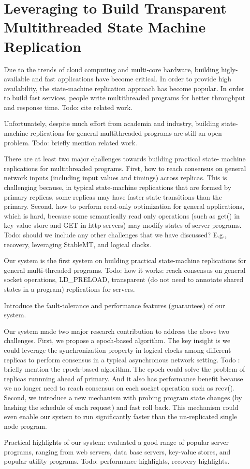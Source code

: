 \section{Leveraging \smt to Build Transparent Multithreaded State Machine Replication} \label{sec:replication}

Due to the trends of cloud computing and multi-core hardware, building higly-
available and fast applications have become critical. In order to 
provide high availability, the state-machine replication approach has become 
popular. In order to build fast services, people write multithreaded programs 
for better throughput and response time. Todo: cite related work.

Unfortunately, despite much effort from academia and industry, building state-
machine replications for general multithreaded programs are still an open 
problem. Todo: briefly mention related work.

There are at least two major challenges towards building practical state-
machine replications for multithreaded programs. First, how to reach 
consensus on general network inputs (including input values and timings) 
across replicas. This is challenging because, in typical state-machine 
replications that are formed by primary replicas, some replicas may have 
faster state transitions than the primary. Second, how to perform read-only 
optimization for general applications, which is hard, because some 
semantically read only operations (such as get() in key-value store and GET 
in http servers) may modify states of server programs. Todo: should we 
include any other challenges that we have discussed? E.g., recovery, 
leveraging StableMT, and logical clocks.

Our system is the first system on building practical state-machine 
replications for general multi-threaded programs. Todo: how it works: reach 
consensus on general socket operations, LD\_PRELOAD, transparent (do not need 
to annotate shared states in a program) replications for servers.

Introduce the fault-tolerance and performance features (guarantees) of our 
system.

Our system made two major research contribution to address the above two 
challenges. First, we propose a epoch-based algorithm. The key insight is we 
could leverage the synchronization property in logical clocks among different 
replicas to perform consensus in a typical asynchronous network setting. Todo
: briefly mention the epoch-based algorithm. The epoch could solve the 
problem of replicas runnning ahead of primary. And it also has performance 
benefit because we no longer need to reach consensus on each socket operation 
such as recv(). Second, we introduce a new mechanism with probing program 
state changes (by hashing the schedule of each request) and fast roll back. 
This mechanism could even enable our system to run significantly faster than 
the un-replicated single node program.

Practical highlights of our system: evaluated a good range of popular server 
programs, ranging from web servers, data base servers, key-value stores, and 
popular utility programs. Todo: performance highlights, recovery highlights.
